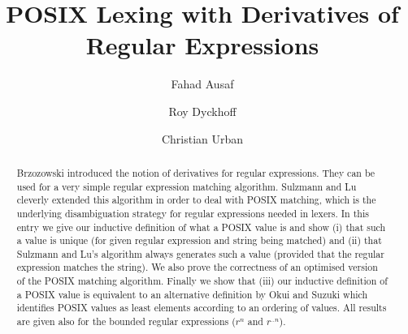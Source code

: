 \documentclass[11pt,a4paper]{article}
\begin{document}
\title{POSIX Lexing with Derivatives of Regular Expressions}
\author{Fahad Ausaf \and Roy Dyckhoff \and Christian Urban}
\maketitle

\begin{abstract}
  Brzozowski introduced the notion of derivatives for regular
  expressions. They can be used for a very simple regular expression
  matching algorithm. Sulzmann and Lu \cite{Sulzmann2014} cleverly extended this algorithm
  in order to deal with POSIX matching, which is the underlying
  disambiguation strategy for regular expressions needed in
  lexers. In this entry we give our inductive definition
  of what a POSIX value is and show (i) that such a value is unique (for
  given regular expression and string being matched) and (ii) that
  Sulzmann and Lu's algorithm always generates such a value (provided
  that the regular expression matches the string). We also prove the
  correctness of an optimised version of the POSIX matching
  algorithm. Finally we show that
  (iii) our inductive definition of a POSIX value is equivalent
  to an alternative definition by Okui and Suzuki \cite{OkuiSuzuki2010} which
  identifies POSIX values as least elements according to an
  ordering of values. All results are given also for the bounded
  regular expressions ($r^{n}$ and $r^{..n}$).
\end{abstract}

\tableofcontents





\end{document}

